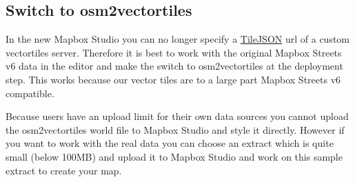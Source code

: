 \subsection{Switch to osm2vectortiles}\label{switch-to-osm2vectortiles}

In the new Mapbox Studio you can no longer specify a
\href{https://github.com/mapbox/tilejson-spec}{TileJSON} url of a custom
vectortiles server. Therefore it is best to work with the original
Mapbox Streets v6 data in the editor and make the switch to
osm2vectortiles at the deployment step. This works because our vector
tiles are to a large part Mapbox Streets v6 compatible.

Because users have an upload limit for their own data sources you cannot
upload the osm2vectortiles world file to Mapbox Studio and style it
directly. However if you want to work with the real data you can choose
an extract which is quite small (below 100MB) and upload it to Mapbox
Studio and work on this sample extract to create your map.